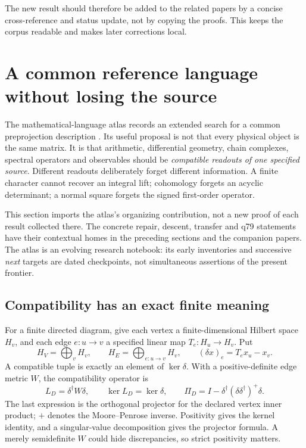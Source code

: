 \documentclass[11pt,a4paper]{article}
\begin{document}
The new result should therefore be added to the related papers by a concise
cross-reference and status update, not by copying the proofs.  This keeps the
corpus readable and makes later corrections local.

\section{A common reference language without losing the source}
\label{sec:atlas-reference}

The mathematical-language atlas records an extended search for a common
preprojection description \cite{MTTLanguageAtlas}. Its useful proposal is
not that every physical object is the same matrix. It is that arithmetic,
differential geometry, chain complexes, spectral operators and observables
should be \emph{compatible readouts of one specified source}. Different
readouts deliberately forget different information. A finite character
cannot recover an integral lift; cohomology forgets an acyclic
determinant; a normal square forgets the signed first-order operator.

This section imports the atlas's organizing contribution, not a new proof
of each result collected there. The concrete repair, descent, transfer and
q79 statements have their contextual homes in the preceding sections and
the companion papers. The atlas is an evolving research notebook: its
early inventories and successive \emph{next} targets are dated checkpoints,
not simultaneous assertions of the present frontier.

\subsection{Compatibility has an exact finite meaning}
\label{sec:atlas-linear}

For a finite directed diagram, give each vertex a finite-dimensional
Hilbert space \(H_v\), and each edge \(e:u\to v\) a specified linear map
\(T_e:H_u\to H_v\). Put
\[
 H_V=\bigoplus_v H_v,\qquad H_E=\bigoplus_{e:u\to v}H_v,\qquad
 (\delta x)_e=T_ex_u-x_v .
\]
A compatible tuple is exactly an element of \(\ker\delta\). With a
positive-definite edge metric \(W\), the compatibility operator is
\begin{equation}
 L_D=\delta^\dagger W\delta,\qquad
 \ker L_D=\ker\delta,\qquad
 \Pi_D=I-\delta^\dagger(\delta\delta^\dagger)^+\delta .
 \tag{R1}\label{eq:atlas-compatibility}
\end{equation}
The last expression is the orthogonal projector for the declared vertex
inner product; \(+\) denotes the Moore--Penrose inverse. Positivity gives
the kernel identity, and a singular-value decomposition gives the
projector formula. A merely semidefinite \(W\) could hide discrepancies,
so strict positivity matters.
\end{document}
